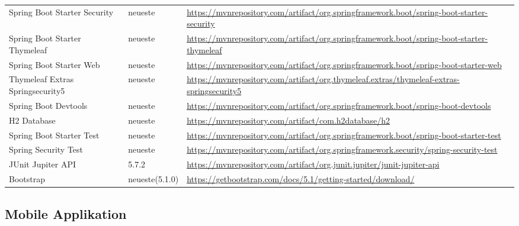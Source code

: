 {\begin{center}
\begin{longtable}[h]{p{4cm} p{2cm} p{8cm}}
    \rowcolor[HTML]{E7E7E7}
    Spring Boot Starter Security     & neueste          & \url{https://mvnrepository.com/artifact/org.springframework.boot/spring-boot-starter-security}   \\
    Spring Boot Starter Thymeleaf    & neueste          & \url{https://mvnrepository.com/artifact/org.springframework.boot/spring-boot-starter-thymeleaf}  \\
    \rowcolor[HTML]{E7E7E7}
    Spring Boot Starter Web          & neueste          & \url{https://mvnrepository.com/artifact/org.springframework.boot/spring-boot-starter-web}        \\
    Thymeleaf Extras Springsecurity5 & neueste          & \url{https://mvnrepository.com/artifact/org.thymeleaf.extras/thymeleaf-extras-springsecurity5}   \\
    \rowcolor[HTML]{E7E7E7}
    Spring Boot Devtools             & neueste          & \url{https://mvnrepository.com/artifact/org.springframework.boot/spring-boot-devtools}           \\
    H2 Database                      & neueste          & \url{https://mvnrepository.com/artifact/com.h2database/h2}                                       \\
    \rowcolor[HTML]{E7E7E7}
    Spring Boot Starter Test         & neueste          & \url{https://mvnrepository.com/artifact/org.springframework.boot/spring-boot-starter-test}       \\
    Spring Security Test             & neueste          & \url{https://mvnrepository.com/artifact/org.springframework.security/spring-security-test}       \\
    \rowcolor[HTML]{E7E7E7}
    JUnit Jupiter API                & 5.7.2            & \url{https://mvnrepository.com/artifact/org.junit.jupiter/junit-jupiter-api}                     \\
    Bootstrap                        & neueste(5.1.0)   & \url{https://getbootstrap.com/docs/5.1/getting-started/download/}                                \\
\end{longtable}
\end{center}

\subsection{Mobile Applikation}

}

